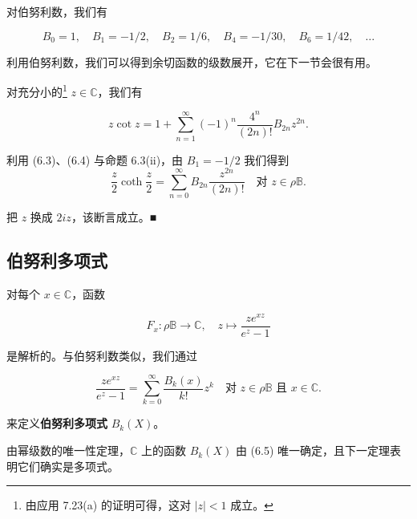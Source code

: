 \begin{corollary}

对伯努利数，我们有

\[
B_0 = 1 , \quad B_1 = -1/2 , \quad B_2 = 1/6 , \quad B_4 = -1/30 , \quad B_6 = 1/42 , \quad \ldots
\]
\end{corollary}

利用伯努利数，我们可以得到余切函数的级数展开，它在下一节会很有用。

\begin{application}

对充分小的\footnote{由应用 7.23(a) 的证明可得，这对 $ |z| < 1 $ 成立。} $ z \in \mathbb{C} $，我们有

\[
z\cot z = 1 + \sum_{n=1}^{\infty}(-1)^n\frac{4^n}{(2n)!}B_{2n}z^{2n} .
\]

\proofhead
利用 (6.3)、(6.4) 与命题 6.3(ii)，由 $ B_1 = -1/2 $ 我们得到
\[
\frac{z}{2}\coth\frac{z}{2} = \sum_{n=0}^{\infty} B_{2n}\frac{z^{2n}}{(2n)!} \quad \text{对 } z \in \rho\mathbb{B} .
\]

把 $ z $ 换成 $ 2iz $，该断言成立。\nobreak\hspace{0.35em}■

\end{application}

\subsection*{伯努利多项式}

对每个 $ x \in \mathbb{C} $，函数

\[
F_x : \rho\mathbb{B} \to \mathbb{C} , \quad z \mapsto \frac{ze^{xz}}{e^z - 1}
\]

是解析的。与伯努利数类似，我们通过

\begin{equation}
\frac{ze^{xz}}{e^z - 1} = \sum_{k=0}^{\infty}\frac{B_k(x)}{k!}z^k \quad \text{对 } z \in \rho\mathbb{B} \text{ 且 } x \in \mathbb{C} .\tag{6.5}
\end{equation}

来定义\textbf{伯努利多项式} $ B_k(X) $。

由幂级数的唯一性定理，$ \mathbb{C} $ 上的函数 $ B_k(X) $ 由 (6.5) 唯一确定，且下一定理表明它们确实是多项式。

